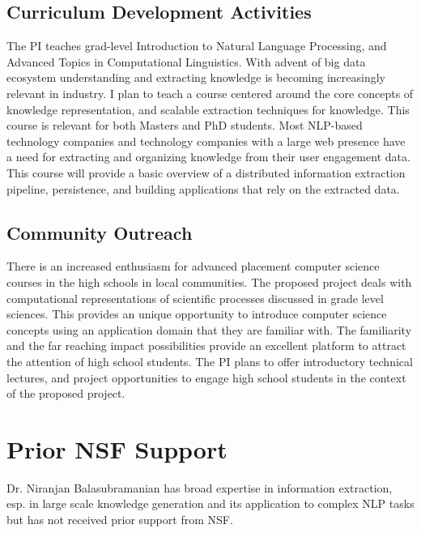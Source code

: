 \subsection{Curriculum Development Activities}

The PI teaches grad-level Introduction to Natural Language Processing, and Advanced Topics in Computational Linguistics. 
With advent of big data ecosystem understanding and extracting knowledge is becoming increasingly relevant in industry.
I plan to teach a course centered around the core concepts of knowledge representation, and scalable extraction techniques for knowledge. This course is relevant for both Masters and PhD students. Most NLP-based technology companies and technology companies with a large web presence have a need for extracting and organizing knowledge from their user engagement data. This course will provide a basic overview of a distributed information extraction pipeline, persistence, and building applications that rely on the extracted data. 

\subsection{Community Outreach}

There is an increased enthusiasm for advanced placement computer science courses in the high schools in local communities. 
The proposed project deals with computational representations of scientific processes discussed in grade level sciences. 
This provides an unique opportunity to introduce computer science concepts using an application domain that they are familiar with.
The familiarity and the far reaching impact possibilities provide an excellent platform to attract the attention of high school students.
The PI plans to offer introductory technical lectures, and project opportunities to engage high school students in the context of the proposed project. 

\section{Prior NSF Support}

Dr. Niranjan Balasubramanian has broad expertise in information extraction, esp. in large scale knowledge generation and its application to complex NLP tasks but has not received prior support from NSF. 
